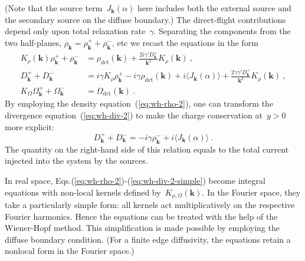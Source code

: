 \documentclass[preprint,aps,eqsecnum, prb]{revtex4-1}
\newcommand{\fplus}[1]{{#1}^{+}}
\newcommand{\fminus}[1]{{#1}^{-}}
\newcommand{\dct}[1]{{#1}_\mathrm{dct}}
\begin{document}
(Note that the source term~$J_{\bm k}(\alpha)$ here includes
both the external source and the secondary source on the diffuse boundary.)
The direct-flight contributions depend only upon total relaxation rate~$\gamma$.
Separating the components from the two half-planes,
$\rho_{\bm k} = \fplus{\rho}_{\bm k} + \fminus{\rho}_{\bm k}$, etc we
recast the equations in the form
\begin{align}
  K_\rho({\bm k}) \fplus{\rho}_{\bm k} + \fminus{\rho}_{\bm k}
  &= \dct{\rho}({\bm k})
        + \frac{2 i \gamma' \fplus{D}_{\bm k}}{{\bm k}^2} K_\rho({\bm k})
  \ ,
  \label{eq:wh-rho-2}
 \\
  \fplus{D}_{\bm k} + \fminus{D}_{\bm k} &= i \gamma K_\rho \fplus{\rho}_{\bm k}
  -i \gamma \dct{\rho}({\bm k}) + i \langle J_{\bm k}(\alpha) \rangle
  + \frac{2\gamma\gamma' \fplus{D}_{\bm k}}{{\bm k}^2} K_\rho({\bm k})\ ,
  \label{eq:wh-div-2}
  \\
  K_\Omega\fplus{\Omega}_{\bm k} + \fminus{\Omega}_{\bm k}
  &= \dct{\Omega}({\bm k})
  \ .
  \label{eq:wh-omega-2}
\end{align}
By employing the density equation~(\ref{eq:wh-rho-2}), one can transform
the divergence equation~(\ref{eq:wh-div-2}) to make
the charge conservation at~$y > 0$ more explicit:
\begin{equation}
\label{eq:wh-div-2-simple}
\fplus{D}_{\bm k} + \fminus{D}_{\bm k} = -i \gamma \fminus{\rho}_{\bm k}
+ i \langle J_{\bm k}(\alpha) \rangle \ .
\end{equation}
The quantity on the right-hand side of this relation
equals to the total current
injected into the system by the sources.

In real space, Eqs.(\ref{eq:wh-rho-2})-(\ref{eq:wh-div-2-simple})
become integral equations with non-local kernels defined
by~$K_{\rho, \Omega}({\bm k})$. In the Fourier space, they take a particularly
simple form: all kernels act multiplicatively on the respective
Fourier harmonics. Hence the equations can be
treated with the help of the Wiener-Hopf method. This simplification is
made possible by employing the diffuse boundary condition. (For a finite
edge diffusivity, the equations retain a nonlocal form in the Fourier space.)
\end{document}
